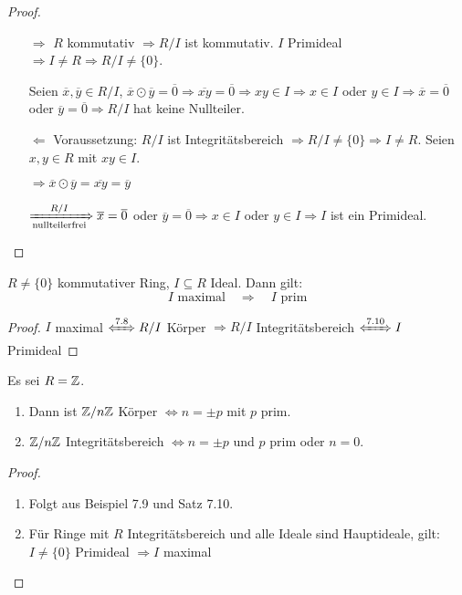 \documentclass[12pt,a4paper]{scrartcl}
\begin{document}
\begin{proof}
	\leavevmode
	\begin{itemize}
		\item[\glqq $\Rightarrow$\grqq] $R$ kommutativ $\Rightarrow R/I$ ist kommutativ.
		$I$ Primideal $\Rightarrow I\neq R\Rightarrow R/I \neq\{0\}$. 
		
		Seien $\overline{x}, \overline{y}\in R/I$, $\overline{x}\odot\overline{y} = \overline{0}\Rightarrow \overline{xy} = \overline{0}\Rightarrow xy\in I\Rightarrow x\in I$ oder $y\in I\Rightarrow \overline{x} = \overline{0}$ oder $\overline{y} = \overline{0}\Rightarrow R/I$ hat keine Nullteiler.
		
		\item[\glqq$\Leftarrow$\grqq] Voraussetzung: $R/I$ ist Integritätsbereich $\Rightarrow R/I \neq \{0\}\Rightarrow I \neq R$. Seien $x,y\in R$ mit $xy\in I$.
		
		$\Rightarrow \overline{x}\odot\overline{y} = \overline{xy} = \overline{y}$
		
		$\xRightarrow[\text{nullteilerfrei}]{R/I} \overline{x} = \overline{0}$ oder $\overline{y} = \overline{0}\Rightarrow x\in I$ oder $y\in I\Rightarrow I$ ist ein Primideal.
	\end{itemize}
\end{proof}

\begin{kor} \label{cor:maxprim}
	$R\neq\{0\}$ kommutativer Ring, $I\subseteq R$ Ideal. Dann gilt: \[\text{$I$ maximal} \quad  \Longrightarrow \quad  \text{$I $ prim} \]
\end{kor}
\begin{proof}
	$I$ maximal $\xLeftrightarrow{7.8}  R/I$ Körper $\Rightarrow R/I$ Integritätsbereich $\xLeftrightarrow{7.10} I$ Primideal
\end{proof}


\begin{kor}
	Es sei $R=\mathbb Z$.
	\begin{enumerate}
	\item Dann ist $\mathbb Z/n\mathbb Z$ Körper $\Leftrightarrow n = \pm p$ mit $p$ prim.
	\item  $\mathbb Z/n\mathbb Z$ Integritätsbereich $\Leftrightarrow n = \pm p$ und $p$ prim oder $n = 0$.
	\end{enumerate}
\end{kor}

\begin{proof}
	\leavevmode
	\begin{enumerate}
		\item Folgt aus Beispiel 7.9 und Satz 7.10.
		\item Für Ringe mit $R$ Integritätsbereich und alle Ideale sind Hauptideale, gilt: $I \neq \{0\}$ Primideal $\Rightarrow I $ maximal
		\end{enumerate}
\end{proof}	
	
\end{document}
